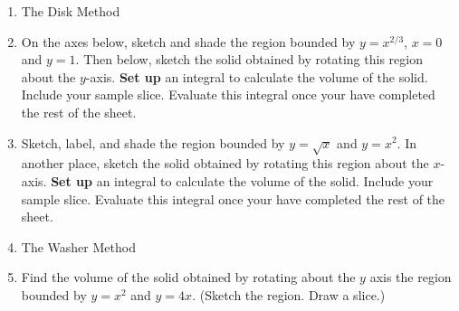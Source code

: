 \documentclass[11pt,fleqn]{article}
\begin{document}
\begin{enumerate}
\vfill

\item The Disk Method

\vspace{1.5in}
\newpage
\item On the axes below, sketch and shade the region bounded by $y=x^{2/3}$, $x=0$ and $y=1.$ Then below, sketch the solid obtained by rotating this region about the {\Large{$y$-axis}}.  \textbf{Set up} an integral to calculate the volume of the solid. Include your sample slice. Evaluate this integral once your have completed the rest of the sheet.\\

\vfill
\item Sketch, label, and shade the region bounded by $y=\sqrt{x}$ and $y=x^2$. In another place, sketch the solid obtained by rotating this region about the $x$-axis.  \textbf{Set up} an integral to calculate the volume of the solid. Include your sample slice. Evaluate this integral once your have completed the rest of the sheet.\\


\vfill
\newpage
\item The Washer Method

\vspace{2in}


\item Find the volume of the solid obtained by rotating about the $y$ axis the region bounded by $y=x^2$ and $y=4x.$ (Sketch the region. Draw a slice.)
\vfill
\end{enumerate}
\end{document}
